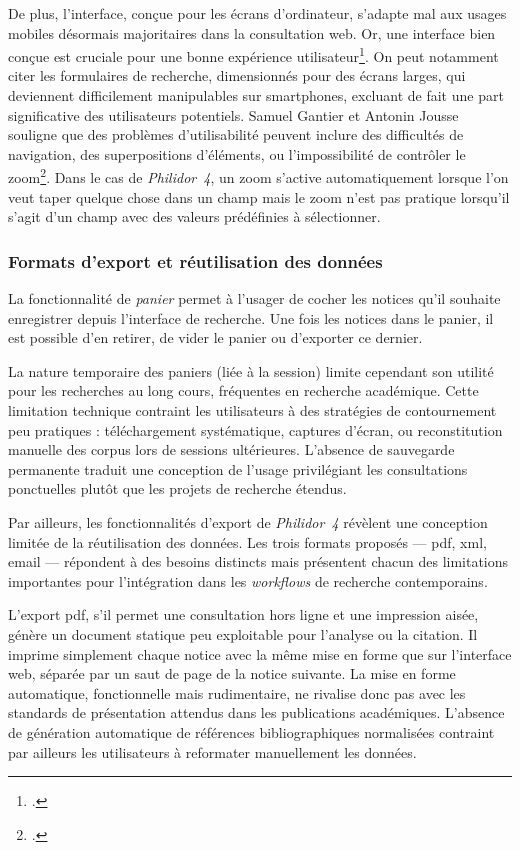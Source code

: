 De plus, l'interface, conçue pour les écrans d'ordinateur, s'adapte mal aux usages mobiles désormais majoritaires dans la consultation web. Or, une interface bien conçue est cruciale pour une bonne expérience utilisateur\footcite{gantierRetroingenierieWebdocumentaireFind2020}. On peut notamment citer les formulaires de recherche, dimensionnés pour des écrans larges, qui deviennent difficilement manipulables sur smartphones, excluant de fait une part significative des utilisateurs potentiels. Samuel Gantier et Antonin Jousse souligne que des problèmes d'utilisabilité peuvent inclure des difficultés de navigation, des superpositions d'éléments, ou l'impossibilité de contrôler le zoom\footcite{gantierRetroingenierieWebdocumentaireFind2020}. Dans le cas de \textit{Philidor~4}, un zoom s'active automatiquement lorsque l'on veut taper quelque chose dans un champ mais le zoom n'est pas pratique lorsqu'il s'agit d'un champ avec des valeurs prédéfinies à sélectionner.

\subsubsection{Formats d'export et réutilisation des données}

La fonctionnalité de \textit{panier} permet à l'usager de cocher les notices qu'il souhaite enregistrer depuis l'interface de recherche. Une fois les notices dans le panier, il est possible d'en retirer, de vider le panier ou d'exporter ce dernier.

La nature temporaire des paniers (liée à la session) limite cependant son utilité pour les recherches au long cours, fréquentes en recherche académique. Cette limitation technique contraint les utilisateurs à des stratégies de contournement peu pratiques : téléchargement systématique, captures d'écran, ou reconstitution manuelle des corpus lors de sessions ultérieures. L'absence de sauvegarde permanente traduit une conception de l'usage privilégiant les consultations ponctuelles plutôt que les projets de recherche étendus.

Par ailleurs, les fonctionnalités d'export de \textit{Philidor~4} révèlent une conception limitée de la réutilisation des données. Les trois formats proposés --- \gls{pdf}, \gls{xml}, email --- répondent à des besoins distincts mais présentent chacun des limitations importantes pour l'intégration dans les \textit{\glspl{workflow}} de recherche contemporains.

L'export \gls{pdf}, s'il permet une consultation hors ligne et une impression aisée, génère un document statique peu exploitable pour l'analyse ou la citation. Il imprime simplement chaque notice avec la même mise en forme que sur l'interface web, séparée par un saut de page de la notice suivante. La mise en forme automatique, fonctionnelle mais rudimentaire, ne rivalise donc pas avec les standards de présentation attendus dans les publications académiques. L'absence de génération automatique de références bibliographiques normalisées contraint par ailleurs les utilisateurs à reformater manuellement les données.

